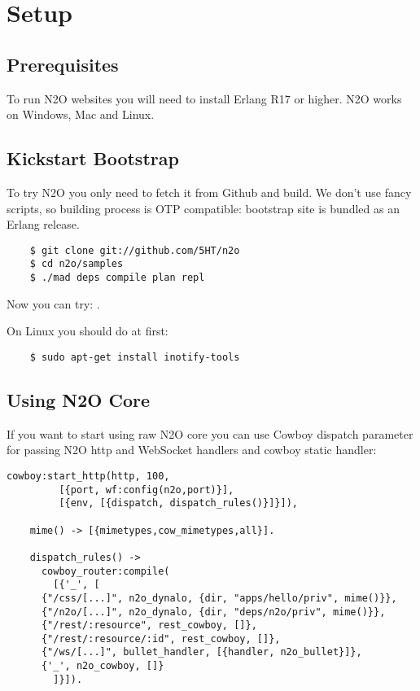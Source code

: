 \section{Setup}

\subsection{Prerequisites}
To run N2O websites you will need to install Erlang R17 or higher.
N2O works on Windows, Mac and Linux.

\subsection{Kickstart Bootstrap}
To try N2O you only need to fetch it from Github and build. We don't use
fancy scripts, so building process is OTP compatible: bootstrap site
is bundled as an Erlang release.

\vspace{1\baselineskip}
\begin{lstlisting}
    $ git clone git://github.com/5HT/n2o
    $ cd n2o/samples
    $ ./mad deps compile plan repl
\end{lstlisting}
\vspace{1\baselineskip}

Now you can try: .

On Linux you should do at first:

\begin{lstlisting}
    $ sudo apt-get install inotify-tools
\end{lstlisting}

\newpage
\subsection{Using N2O Core}
If you want to start using raw N2O core you can use Cowboy dispatch parameter
for passing N2O http and WebSocket handlers and cowboy static handler:

\begin{lstlisting}[caption=web\_sup.erl]
    cowboy:start_http(http, 100,
         [{port, wf:config(n2o,port)}],
         [{env, [{dispatch, dispatch_rules()}]}]),

    mime() -> [{mimetypes,cow_mimetypes,all}].

    dispatch_rules() ->
      cowboy_router:compile(
        [{'_', [
      {"/css/[...]", n2o_dynalo, {dir, "apps/hello/priv", mime()}},
      {"/n2o/[...]", n2o_dynalo, {dir, "deps/n2o/priv", mime()}},
      {"/rest/:resource", rest_cowboy, []},
      {"/rest/:resource/:id", rest_cowboy, []},
      {"/ws/[...]", bullet_handler, [{handler, n2o_bullet}]},
      {'_', n2o_cowboy, []}
        ]}]).
\end{lstlisting}
\vspace{1\baselineskip}

